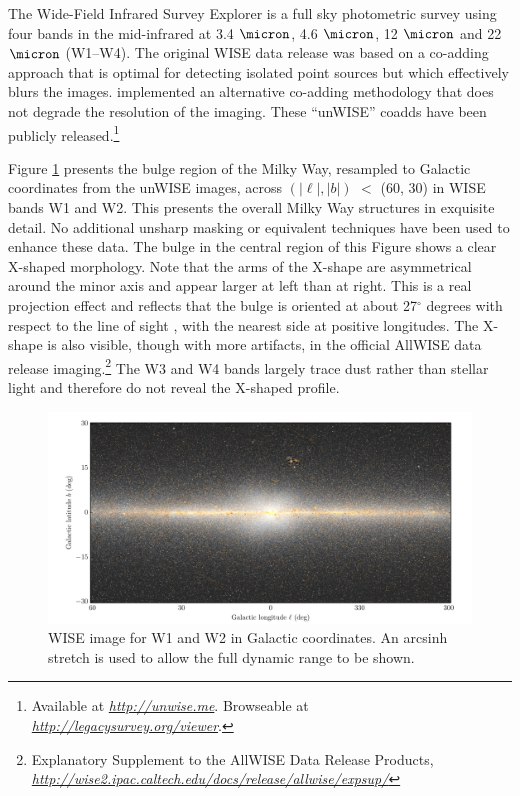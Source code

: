 \documentclass[12pt, preprint]{aastex}
\newcommand{\niceurl}[1]{\href{#1}{\textsl{#1}}}
\newcommand{\viewerurl}{\niceurl{http://legacysurvey.org/viewer}}
\begin{document}
The Wide-Field Infrared Survey Explorer \citep[WISE;][]{W2010} is a full sky photometric survey using four bands in the mid-infrared at 3.4 $\micron$, 4.6 $\micron$, 12 $\micron$ and 22 $\micron$ (W1--W4). The original WISE data release was based on a co-adding approach that is optimal for detecting isolated point sources but which effectively blurs the images. \citet{Lang2014a} implemented an alternative co-adding methodology that does not degrade the resolution of the imaging.  These ``unWISE'' coadds have been publicly released.\footnote{Available at \niceurl{http://unwise.me}. Browseable at \viewerurl.}

Figure \ref{fig:xbulge} presents the bulge region of the Milky Way,  resampled to Galactic coordinates from the unWISE images, across $(|\ell|,|b|)$ $<$ (60, 30) in WISE bands W1 and W2.  This presents the overall Milky Way structures in exquisite detail.
No additional unsharp masking or equivalent techniques have been used to enhance these data. The bulge in the central region of this Figure shows a clear X-shaped morphology. Note that the arms of the X-shape are asymmetrical around the minor axis and appear larger at left than at right. This is a real projection effect and reflects that the bulge is oriented at about 27$^\circ$ degrees with respect to the line of sight \citep{Wegg2013}, with the nearest side at positive longitudes. The X-shape is also visible, though with more artifacts, in the official AllWISE data release imaging.\footnote{Explanatory
  Supplement to the AllWISE Data Release Products, 
  \niceurl{http://wise2.ipac.caltech.edu/docs/release/allwise/expsup/}}
%
The W3 and W4 bands largely trace dust rather than stellar light and therefore
do not reveal the X-shaped profile.

\begin{figure}[h!]
\centering
        \includegraphics[width=\textwidth]{xbulge-00}
\caption{WISE image for W1 and W2 in Galactic coordinates.  An arcsinh
  stretch is used to allow the full dynamic range to be shown.}
\label{fig:xbulge}
\end{figure}
\end{document}
